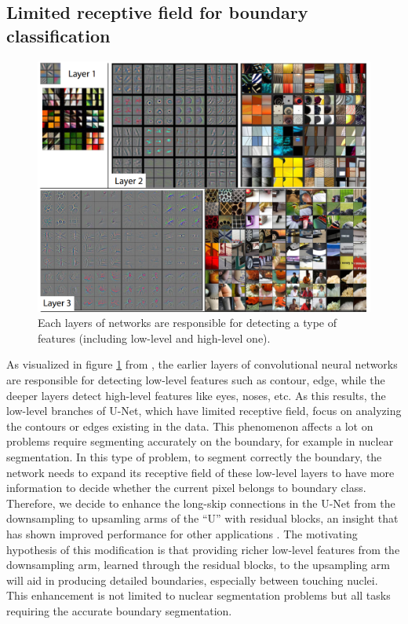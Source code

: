 \subsection{Limited receptive field for boundary classification}

\begin{figure}[thb]
    \centering
    \includegraphics[width=\textwidth]{resources/5_feautures.png}
    \caption{Each layers of networks \cite{ZFNet} are responsible for detecting a type of features (including low-level and high-level one).}
    \label{fig:low_high_features}
\end{figure}

As visualized in figure \ref{fig:low_high_features} from \cite{ZFNet}, the earlier layers of convolutional neural networks are responsible for detecting low-level features such as contour, edge, while the deeper layers detect high-level features like eyes, noses, etc. As this results, the low-level branches of U-Net, which have limited receptive field, focus on analyzing the contours or edges existing in the data. This phenomenon affects a lot on problems require segmenting accurately on the boundary, for example in nuclear segmentation. In this type of problem, to segment correctly the boundary, the network needs to expand its receptive field of these low-level layers to have more information to decide whether the current pixel belongs to boundary class. Therefore, we decide to enhance the long-skip connections in the U-Net from the downsampling to upsamling arms of the “U” with residual blocks, an insight that has shown improved performance for other applications \cite{DeepLabv1}. The motivating hypothesis of this modification is that providing richer low-level features from the downsampling arm, learned through the residual blocks, to the upsampling arm will aid in producing detailed boundaries, especially between touching nuclei. This enhancement is not limited to nuclear segmentation problems but all tasks requiring the accurate boundary segmentation. 

